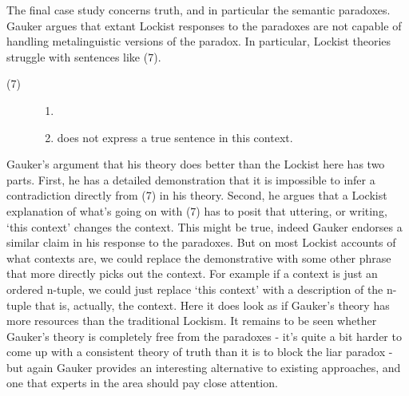 \documentclass[
  11pt,
  letterpaper,
  DIV=11,
  numbers=noendperiod,
  oneside]{scrartcl}
\providecommand{\tightlist}{%
  \setlength{\itemsep}{0pt}\setlength{\parskip}{0pt}}\usepackage{longtable,booktabs,array}
\begin{document}
The final case study concerns truth, and in particular the semantic
paradoxes. Gauker argues that extant Lockist responses to the paradoxes
are not capable of handling metalinguistic versions of the paradox. In
particular, Lockist theories struggle with sentences like (7).

\begin{description}
\item[(7)]
\begin{enumerate}
\def\labelenumi{(\arabic{enumi})}
\setcounter{enumi}{6}
\tightlist
\item[]
\item
  does not express a true sentence in this context.
\end{enumerate}
\end{description}

Gauker's argument that his theory does better than the Lockist here has
two parts. First, he has a detailed demonstration that it is impossible
to infer a contradiction directly from (7) in his theory. Second, he
argues that a Lockist explanation of what's going on with (7) has to
posit that uttering, or writing, `this context' changes the context.
This might be true, indeed Gauker endorses a similar claim in his
response to the paradoxes. But on most Lockist accounts of what contexts
are, we could replace the demonstrative with some other phrase that more
directly picks out the context. For example if a context is just an
ordered n-tuple, we could just replace `this context' with a description
of the n-tuple that is, actually, the context. Here it does look as if
Gauker's theory has more resources than the traditional Lockism. It
remains to be seen whether Gauker's theory is completely free from the
paradoxes - it's quite a bit harder to come up with a consistent theory
of truth than it is to block the liar paradox - but again Gauker
provides an interesting alternative to existing approaches, and one that
experts in the area should pay close attention.
\end{document}
